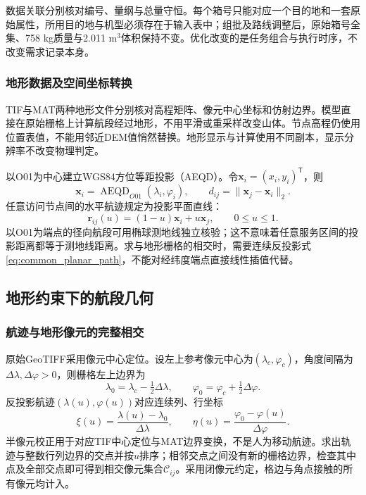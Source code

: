 \documentclass[withoutpreface,colorprint]{format}
\numberwithin{equation}{section}
\numberwithin{figure}{section}
\numberwithin{table}{section}
\begin{document}
数据关联分别核对编号、量纲与总量守恒。每个箱号只能对应一个目的地和一套原始属性，所用目的地与机型必须存在于输入表中；组批及路线调整后，原始箱号全集、758 kg质量与2.011 m$^3$体积保持不变。优化改变的是任务组合与执行时序，不改变需求记录本身。


\subsubsection{地形数据及空间坐标转换}
TIF与MAT两种地形文件分别核对高程矩阵、像元中心坐标和仿射边界。模型直接在原始栅格上计算航段经过地形，不用平滑或重采样改变山体。节点高程仍使用位置表值，不能用邻近DEM值悄然替换。地形显示与计算使用不同副本，显示分辨率不改变物理判定。

以O01为中心建立WGS84方位等距投影（AEQD）\cite{snyder1987}。令$\boldsymbol x_i=(x_i,y_i)^{\mathsf T}$，则
\begin{equation}
\boldsymbol x_i=\operatorname{AEQD}_{O01}(\lambda_i,\varphi_i),\qquad
 d_{ij}=\|\boldsymbol x_j-\boldsymbol x_i\|_2.
\label{eq:common_projection}
\end{equation}
任意访问节点间的水平航迹规定为投影平面直线：
\begin{equation}
\boldsymbol r_{ij}(u)=(1-u)\boldsymbol x_i+u\boldsymbol x_j,\qquad 0\le u\le1.
\label{eq:common_planar_path}
\end{equation}
以O01为端点的径向航段可用椭球测地线独立核验；这不意味着任意服务区间的投影距离都等于测地线距离。求与地形栅格的相交时，需要连续反投影式\eqref{eq:common_planar_path}，不能对经纬度端点直接线性插值代替。

\subsection{地形约束下的航段几何}
\subsubsection{航迹与地形像元的完整相交}
原始GeoTIFF采用像元中心定位。设左上参考像元中心为$(\lambda_c,\varphi_c)$，角度间隔为$\Delta\lambda,\Delta\varphi>0$，则栅格左上边界为
\begin{equation}
\lambda_0=\lambda_c-\tfrac12\Delta\lambda,\qquad
\varphi_0=\varphi_c+\tfrac12\Delta\varphi.
\label{eq:common_half_pixel}
\end{equation}
反投影航迹$(\lambda(u),\varphi(u))$对应连续列、行坐标
\begin{equation}
\xi(u)=\frac{\lambda(u)-\lambda_0}{\Delta\lambda},\qquad
\eta(u)=\frac{\varphi_0-\varphi(u)}{\Delta\varphi}.
\label{eq:common_raster_coordinates}
\end{equation}
半像元校正用于对应TIF中心定位与MAT边界变换，不是人为移动航迹。求出轨迹与整数行列边界的交点并按$u$排序；相邻交点之间没有新的栅格边界，检查其中点及全部交点即可得到相交像元集合$\mathcal C_{ij}$。采用闭像元约定，格边与角点接触的所有像元均计入。
\end{document}
